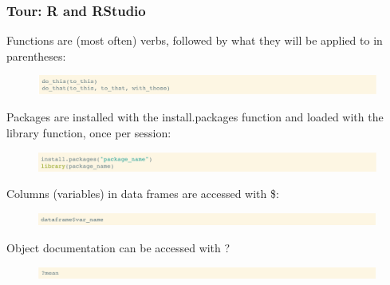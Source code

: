 \documentclass[11pt]{beamer}
\begin{document}

\begin{frame}
	
	
	\frametitle{\textbf{Tour: R and RStudio}}
		\small{Functions are (most often) verbs, followed by what they will be applied to in parentheses:
\begin{figure}

	\centering

	\includegraphics[width=1\linewidth]{Images/S1/code/s1}



\end{figure}
 Packages are installed with the install.packages function and loaded with the library function, once per session:
\begin{figure}
	
	\centering
	

	\includegraphics[width=1\linewidth]{Images/S1/code/s2}
	

\end{figure}

 Columns (variables) in data frames are accessed with \$:
\begin{figure}
	
	\centering
	
	
	\includegraphics[width=1\linewidth]{Images/S1/code/s3}
	
	
\end{figure}
Object documentation can be accessed with ?}
\begin{figure}
	
	\centering
	
	
	\includegraphics[width=1\linewidth]{Images/S1/code/s4}
	
	
\end{figure}
	
\end{frame}


\end{document}
